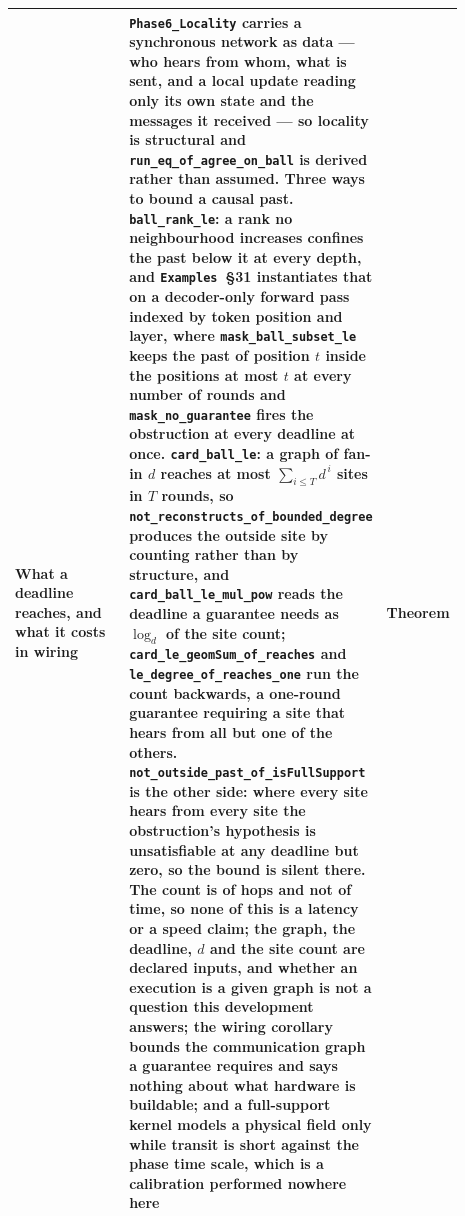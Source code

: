 \documentclass{article}
\begin{document}
\begin{longtable}{|>{\raggedright\arraybackslash}p{0.26\linewidth}|>{\raggedright\arraybackslash}p{0.46\linewidth}|>{\raggedright\arraybackslash}p{0.17\linewidth}|}
What a deadline reaches, and what it costs in wiring & \nolinkurl{Phase6_Locality} carries a synchronous network as data --- who hears from whom, what is sent, and a local update reading only its own state and the messages it received --- so locality is structural and \nolinkurl{run_eq_of_agree_on_ball} is derived rather than assumed. Three ways to bound a causal past. \nolinkurl{ball_rank_le}: a rank no neighbourhood increases confines the past below it at every depth, and \texttt{Examples}~\S31 instantiates that on a decoder-only forward pass indexed by token position and layer, where \nolinkurl{mask_ball_subset_le} keeps the past of position $t$ inside the positions at most $t$ at every number of rounds and \nolinkurl{mask_no_guarantee} fires the obstruction at every deadline at once. \nolinkurl{card_ball_le}: a graph of fan-in $d$ reaches at most $\sum_{i\leq T}d^{\,i}$ sites in $T$ rounds, so \nolinkurl{not_reconstructs_of_bounded_degree} produces the outside site by counting rather than by structure, and \nolinkurl{card_ball_le_mul_pow} reads the deadline a guarantee needs as $\log_d$ of the site count; \nolinkurl{card_le_geomSum_of_reaches} and \nolinkurl{le_degree_of_reaches_one} run the count backwards, a one-round guarantee requiring a site that hears from all but one of the others. \nolinkurl{not_outside_past_of_isFullSupport} is the other side: where every site hears from every site the obstruction's hypothesis is unsatisfiable at any deadline but zero, so the bound is silent there. The count is of hops and not of time, so none of this is a latency or a speed claim; the graph, the deadline, $d$ and the site count are declared inputs, and whether an execution is a given graph is not a question this development answers; the wiring corollary bounds the communication graph a guarantee requires and says nothing about what hardware is buildable; and a full-support kernel models a physical field only while transit is short against the phase time scale, which is a calibration performed nowhere here & Theorem \\ \hline

\end{longtable}
\end{document}
